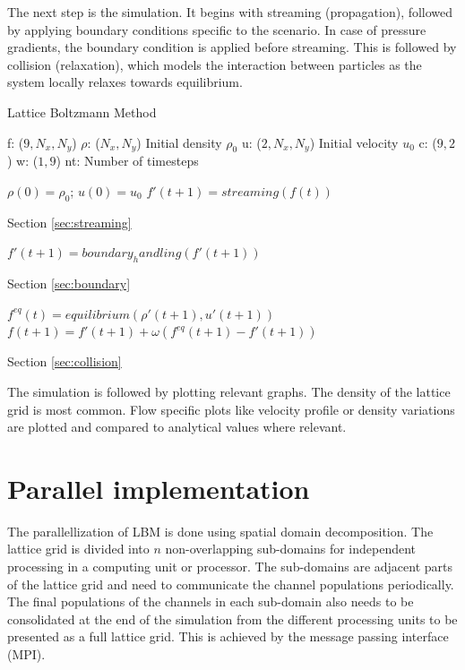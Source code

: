 \documentclass[a4paper,11pt]{report}
\begin{document}
The next step is the simulation. It begins with streaming (propagation), followed by applying boundary conditions specific to the scenario. In case of pressure gradients, the boundary condition is applied before streaming. This is followed by collision (relaxation), which models the interaction between particles as the system locally relaxes towards equilibrium. \cite{Krueger2017TheLB}

\begin{algorithm}
  \caption{Lattice Boltzmann Method}
  \label{alg:lbm}
  \begin{algorithmic}
    \STATE f: ($9, N_x, N_y$)
    \STATE $\rho$: ($N_x, N_y$) Initial density $\rho_0$
    \STATE u: ($2, N_x, N_y$) Initial velocity $u_0$
    \STATE c: ($9, 2$)
    \STATE w: ($1, 9$)
    \STATE nt: Number of timesteps

  \end{algorithmic}
  \begin{algorithmic}[1]
    \STATE $\rho\left(0\right)=\rho_0$; $u\left(0\right)=u_0$
      \STATE $f'(t + 1) = streaming(f(t))$ \begin{flushright}Section \ref{sec:streaming}\end{flushright}
      \STATE $f'(t + 1) = boundary_handling(f'(t+1))$ \begin{flushright}Section \ref{sec:boundary}\end{flushright}
      \STATE $f^{eq}(t) = equilibrium(\rho'(t+1),u'(t+1))$ 
      \STATE $f(t+1) = f'(t+1) + \omega(f^{eq}(t+1) - f'(t+1))$ \begin{flushright}Section \ref{sec:collision}\end{flushright}
    \ENDFOR
  \end{algorithmic}
\end{algorithm}


The simulation is followed by plotting relevant graphs. The density of the lattice grid is most common. Flow specific plots like velocity profile or density variations are plotted and compared to analytical values where relevant.

\section{Parallel implementation}
The parallellization of LBM is done using spatial domain decomposition. The lattice grid is divided into $n$ non-overlapping sub-domains for independent processing in a computing unit or processor. The sub-domains are adjacent parts of the lattice grid and need to communicate the channel populations periodically. The final populations of the channels in each sub-domain also needs to be consolidated at the end of the simulation from the different processing units to be presented as a full lattice grid. This is achieved by the message passing interface (MPI).
\end{document}
